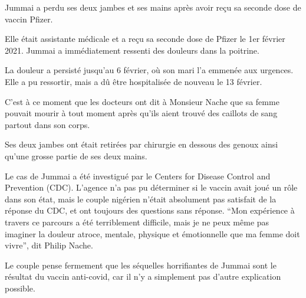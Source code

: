 Jummai a perdu ses deux jambes et ses mains après avoir reçu sa seconde dose de
vaccin Pfizer.

Elle était assistante médicale et a reçu sa seconde dose de Pfizer le 1er
février 2021. Jummai a immédiatement ressenti des douleurs dans la poitrine.

La douleur a persisté jusqu'au 6 février, où son mari l'a emmenée aux
urgences. Elle a pu ressortir, mais a dû être hospitalisée de nouveau le 13
février.

C'est à ce moment que les docteurs ont dit à Monsieur Nache que sa femme pouvait
mourir à tout moment après qu'ils aient trouvé des caillots de sang partout dans
son corps.

Ses deux jambes ont était retirées par chirurgie en dessous des genoux ainsi
qu'une grosse partie de ses deux mains.

Le cas de Jummai a été investigué par le Centers for Disease Control and
Prevention (CDC). L'agence n'a pas pu déterminer si le vaccin avait joué un rôle
dans son état, mais le couple nigérien n'était absolument pas satisfait de la
réponse du CDC, et ont toujours des questions sans réponse. “Mon expérience à
travers ce parcours a été terriblement difficile, mais je ne peux même pas
imaginer la douleur atroce, mentale, physique et émotionnelle que ma femme doit
vivre”, dit Philip Nache.

Le couple pense fermement que les séquelles horrifiantes de Jummai sont le
résultat du vaccin anti-covid, car il n'y a simplement pas d'autre explication
possible.

